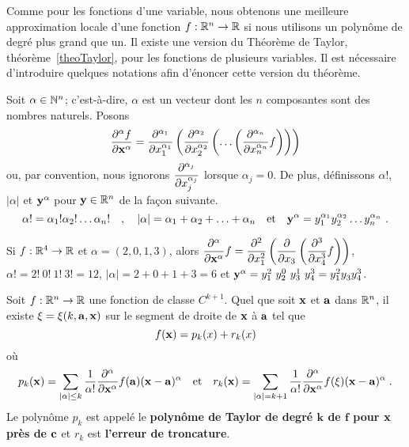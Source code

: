 {Comme pour les fonctions d'une variable, nous obtenons une meilleure
approximation locale d'une fonction $f:\RR^n \to \RR$ si nous utilisons un
polynôme de degré plus grand que un.   Il existe une version du Théorème de
Taylor, théorème~\ref{theoTaylor}, pour les fonctions de plusieurs
variables.  Il est nécessaire d'introduire quelques notations afin
d'énoncer cette version du théorème.

Soit $\alpha \in \NN^n$; c'est-à-dire, $\alpha$ est un vecteur dont
les $n$ composantes sont des nombres naturels.   Posons
\[
  \pdydxn{f}{\VEC{x}}{\alpha} = \pdfdxn{}{x_1}{\alpha_1} \left(
  \pdfdxn{}{x_2}{\alpha_2} \left( \ldots \left(
  \pdfdxn{f}{x_n}{\alpha_n}\right)\right)\right)
\]
ou, par convention, nous ignorons
$\displaystyle \pdfdxn{}{x_j}{\alpha_j}$ lorsque $\alpha_j = 0$.
De plus, définissons $\alpha!$, $|\alpha|$ et $\VEC{y}^{\alpha}$ pour
$\VEC{y}\in \RR^n$ de la façon suivante.
\[
\alpha! = \alpha_1! \alpha_2! \ldots \alpha_n! \quad , \quad
|\alpha| = \alpha_1 + \alpha_2 + \ldots + \alpha_n \quad
\text{et} \quad
\VEC{y}^{\alpha} = y_1^{\alpha_1} y_2^{\alpha_2}\ldots y_n^{\alpha_n} \ .
\]

\begin{egg}
Si $f:\RR^4 \to \RR$ et $\alpha = (2,0,1,3)$, alors
$\displaystyle \pdfdxn{f}{\VEC{x}}{\alpha} = \pdfdxn{}{x_1}{2} \left(
\pdfdx{}{x_3} \left( \pdfdxn{f}{x_4}{3}\right)\right)$,
$\alpha! = 2!\ 0!\ 1!\ 3!= 12$, $|\alpha| = 2 + 0 + 1 + 3 = 6$ et
$\VEC{y}^{\alpha} = y_1^2\ y_2^0\ y_3^1\ y_4^3 = y_1^2 y_3^{} y_4^3$.
\end{egg}

\begin{theorem} 
Soit $f:\RR^n\to \RR$ une fonction de classe $C^{k+1}$.  Quel que soit
$\VEC{x}$ et $\VEC{a}$ dans $\RR^n$, il existe $\xi = \xi(k,\VEC{a},\VEC{x})$
sur le segment de droite de $\VEC{x}$ à $\VEC{a}$ tel que
\[
f(\VEC{x}) = p_k(x) + r_k(x)
\]
où
\[
p_k(\VEC{x}) = \sum_{|\alpha|\leq k} \frac{1}{\alpha !}
  \pdfdxn{f}{\VEC{x}}{\alpha}(\VEC{a}) (\VEC{x}- \VEC{a})^{\alpha} 
\quad \text{et} \quad
r_k(\VEC{x}) = \sum_{|\alpha|=k+1} \frac{1}{\alpha !}
  \pdfdxn{f}{\VEC{x}}{\alpha}(\xi) (\VEC{x}- \VEC{a})^{\alpha} \; .
\]
Le polynôme $p_k$ est appelé le {\bfseries polynôme de Taylor de degré
$\mathbf{k}$ de $\mathbf{f}$ pour $\VEC{x}$ près de
$\VEC{c}$} et $r_k$
est {\bfseries l'erreur de troncature}.
\label{theoTaylorNdim}
\end{theorem}

}
